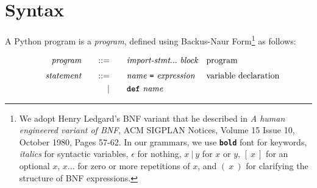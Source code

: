 \section{Syntax}

A Python program is a \emph{program}, defined using Backus-Naur Form\footnote{
We adopt Henry Ledgard's BNF variant that he described in
\emph{A human engineered variant of BNF}, ACM SIGPLAN Notices, Volume 15 Issue 10,
October 1980, Pages 57-62. In our grammars, we use \textbf{\texttt{bold}} font for keywords,
{\it italics} for syntactic variables, $\epsilon$ for nothing,
$x\ |\ y$ for $x$ or $y$, $[\ x\ ]$ for an optional $x$,
$ x ...$ for zero or more repetitions of $x$, and $(\ x\ )$ for clarifying the structure of BNF expressions.}
as follows:

\begin{alignat*}{9}
&& \textit{program}    &&\quad ::= &\quad && \textit{import-stmt} ... \ \textit{block}
                                                           && \textrm{program} \\[1mm]
&& \textit{statement}    &&\quad ::= &\quad && \textit{name} \ \textbf{\texttt{=}}\ \textit{expression}
                                                           && \textrm{variable declaration} \\
&&                       && |   &\quad && \textbf{\texttt{def}}\  \textit{name} \ 

\end{alignat*}
